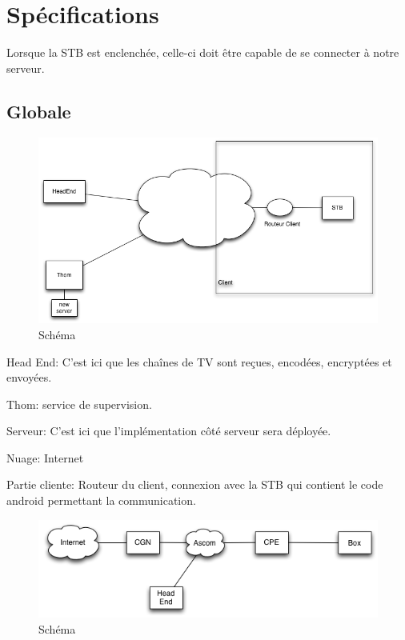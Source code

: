 
\chapter{Spécifications}

Lorsque la STB est enclenchée, celle-ci doit être capable de se connecter à notre serveur.
\section{Globale}
\begin{figure}[H]
    \begin{center}
        \centering \includegraphics[width=0.7\linewidth]{CDC/schema_comm.png}
        \caption{Schéma}
    \end{center}
\end{figure}

Head End: C'est ici que les chaînes de TV sont reçues, encodées, encryptées et envoyées.

Thom: service de supervision.

Serveur: C'est ici que l'implémentation côté serveur sera déployée.

Nuage: Internet

Partie cliente: Routeur du client, connexion avec la STB qui contient le code android permettant la communication.


\begin{figure}[H]
    \begin{center}
        \centering \includegraphics[width=0.7\linewidth]{CDC/schema_comm_client.png}
        \caption{Schéma}
    \end{center}
\end{figure}


